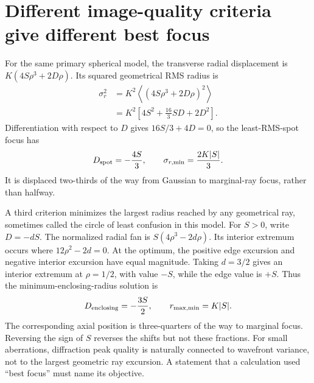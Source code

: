 \section{Different image-quality criteria give different best focus}
For the same primary spherical model, the transverse radial displacement is
$K(4S\rho^3+2D\rho)$. Its squared geometrical RMS radius is
\begin{align}
 \sigma_r^2
 &=K^2\left\langle(4S\rho^3+2D\rho)^2\right\rangle\\
 &=K^2\left[4S^2+\frac{16}{3}SD+2D^2\right].
\end{align}
Differentiation with respect to $D$ gives
$16S/3+4D=0$, so the least-RMS-spot focus has
\begin{equation}
 D_{\rm spot}=-\frac{4S}{3},\qquad
 \sigma_{r,\min}=\frac{2K|S|}{3}.
\end{equation}
It is displaced two-thirds of the way from Gaussian to marginal-ray focus,
rather than halfway.

A third criterion minimizes the largest radius reached by any geometrical
ray, sometimes called the circle of least confusion in this model. For
$S>0$, write $D=-dS$. The normalized radial fan is
$S(4\rho^3-2d\rho)$. Its interior extremum occurs where
$12\rho^2-2d=0$. At the optimum, the positive edge excursion and negative
interior excursion have equal magnitude. Taking $d=3/2$ gives an interior
extremum at $\rho=1/2$, with value $-S$, while the edge value is $+S$.
Thus the minimum-enclosing-radius solution is
\begin{equation}
 D_{\rm enclosing}=-\frac{3S}{2},\qquad
 r_{\max,\min}=K|S|.
\end{equation}
The corresponding axial position is three-quarters of the way to marginal
focus. Reversing the sign of $S$ reverses the shifts but not these fractions.
For small aberrations, diffraction peak quality is naturally connected to
wavefront variance, not to the largest geometric ray excursion. A statement
that a calculation used ``best focus'' must name its objective.

